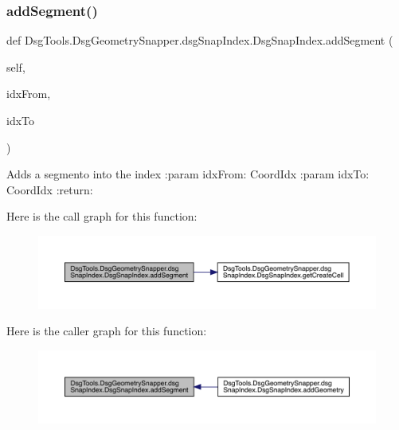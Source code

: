 \subsubsection{\texorpdfstring{add\+Segment()}{addSegment()}}
{\footnotesize\ttfamily def Dsg\+Tools.\+Dsg\+Geometry\+Snapper.\+dsg\+Snap\+Index.\+Dsg\+Snap\+Index.\+add\+Segment (\begin{DoxyParamCaption}\item[{}]{self,  }\item[{}]{idx\+From,  }\item[{}]{idx\+To }\end{DoxyParamCaption})}

\begin{DoxyVerb}Adds a segmento into the index
:param idxFrom: CoordIdx
:param idxTo: CoordIdx
:return:
\end{DoxyVerb}
 Here is the call graph for this function\+:
\nopagebreak
\begin{figure}[H]
\begin{center}
\leavevmode
\includegraphics[width=350pt]{class_dsg_tools_1_1_dsg_geometry_snapper_1_1dsg_snap_index_1_1_dsg_snap_index_a0700c214adf8731c2bc5e473e46fd4b9_cgraph}
\end{center}
\end{figure}
Here is the caller graph for this function\+:
\nopagebreak
\begin{figure}[H]
\begin{center}
\leavevmode
\includegraphics[width=350pt]{class_dsg_tools_1_1_dsg_geometry_snapper_1_1dsg_snap_index_1_1_dsg_snap_index_a0700c214adf8731c2bc5e473e46fd4b9_icgraph}
\end{center}
\end{figure}
\mbox{\label{class_dsg_tools_1_1_dsg_geometry_snapper_1_1dsg_snap_index_1_1_dsg_snap_index_ad42dd41c1bdfc6bdfd6a0965601f9752}} 
